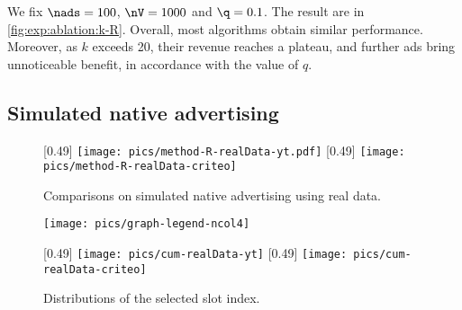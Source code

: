 We fix $\nads=100$, $\nV=1000$ and $\q = 0.1$.
The result are in \cref{fig:exp:ablation:k-R}.
Overall, most algorithms obtain similar performance.
Moreover, as $k$ exceeds 20, their revenue reaches a plateau, and further ads bring unnoticeable benefit, in accordance with the value of $q$. %


\subsection{Simulated native advertising}\label{sec:exp:ad}

\begin{table}
	\caption{Datasets based on real advertisement. We report: $\nads$ number of ads to place, $\nV$ available slots, $|\E|$ number of edges, the range of the rewards and the value of $\q$ used in the experiments.}
	\label{tab:stats}
\end{table}


\begin{figure}[t]
	\centering
	[0.49\columnwidth]{
		{\texttt{[image: pics/method-R-realData-yt.pdf]}}
	}
	\hfill
	[0.49\columnwidth]{
		{\texttt{[image: pics/method-R-realData-criteo]}}
	}
	\caption{Comparisons on simulated native advertising using real data.}
	\label{fig:exp:real}
\end{figure}


\begin{figure}[t]
	\centering
	
	\texttt{[image: pics/graph-legend-ncol4]}
	
	[0.49\columnwidth]{
		{\texttt{[image: pics/cum-realData-yt]}}
	}
	\hfill
	[0.49\columnwidth]{
		{\texttt{[image: pics/cum-realData-criteo]}}
	}
	\caption{Distributions of the selected slot index. 
		}
	\label{fig:exp:cumulativeCurves}
\end{figure}

